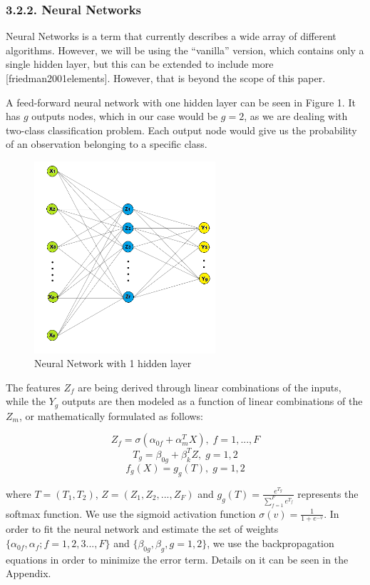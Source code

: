 \documentclass[12pt,]{article}
\begin{document}
\hypertarget{neural-networks}{%
\subsubsection{3.2.2. Neural Networks}\label{neural-networks}}

Neural Networks is a term that currently describes a wide array of
different algorithms. However, we will be using the ``vanilla'' version,
which contains only a single hidden layer, but this can be extended to
include more {[}friedman2001elements{]}. However, that is beyond the
scope of this paper.

A feed-forward neural network with one hidden layer can be seen in
Figure 1. It has \(g\) outputs nodes, which in our case would be
\(g=2\), as we are dealing with two-class classification problem. Each
output node would give us the probability of an observation belonging to
a specific class.

\begin{figure}
\centering
\includegraphics[width=0.6\textwidth,height=\textheight]{figures/nnet.png}
\caption{Neural Network with 1 hidden layer}
\end{figure}

The features \(Z_f\) are being derived through linear combinations of
the inputs, while the \(Y_g\) outputs are then modeled as a function of
linear combinations of the \(Z_m\), or mathematically formulated as
follows:

\[Z_f=\sigma(\alpha_{0f}+\alpha_{m}^{T}X),\;f=1,...,F\]
\[T_g=\beta_{0g}+\beta_{k}^{T}Z,\;g=1,2\] \[f_{g}(X)=g_g(T),\;g=1,2\]

where \(T=(T_1,T_2)\), \(Z=(Z_1,Z_2,...,Z_F)\) and
\(g_g(T)=\frac{e^{T_g}}{\sum_{f=1}^{F}e^{T_f}}\) represents the softmax
function. We use the sigmoid activation function
\(\sigma(v)=\frac{1}{1+e^{-v}}\). In order to fit the neural network and
estimate the set of weights \(\{\alpha_{0f},\alpha_{f};f=1,2,3...,F\}\)
and \(\{\beta_{0g},\beta_{g},g=1,2\}\), we use the backpropagation
equations in order to minimize the error term. Details on it can be seen
in the Appendix.
\end{document}
